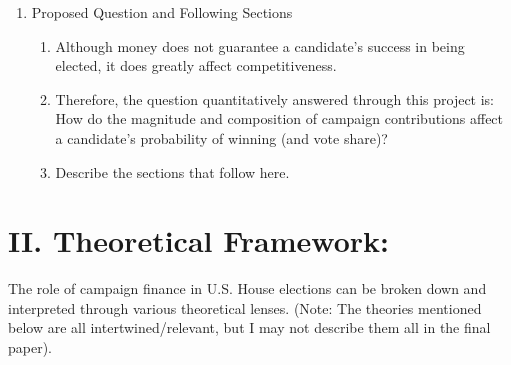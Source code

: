 \documentclass[12pt]{article}
\begin{document}
\begin{enumerate}[label = \Alph*.]
    \item Proposed Question and Following Sections
    \begin{enumerate}[label=\arabic*)]
        \item Although money does not guarantee a candidate's success in being elected, it does greatly affect competitiveness.
        \item Therefore, the question quantitatively answered through this project is: How do the magnitude and composition of campaign contributions affect a candidate's probability of winning (and vote share)?
        \item Describe the sections that follow here.
    \end{enumerate}
  \end{enumerate}
  
\section*{II. Theoretical Framework:} The role of campaign finance in U.S. House elections can be broken down and interpreted through various theoretical lenses. (Note: The theories mentioned below are all intertwined/relevant, but I may not describe them all in the final paper).
    
\end{document}
